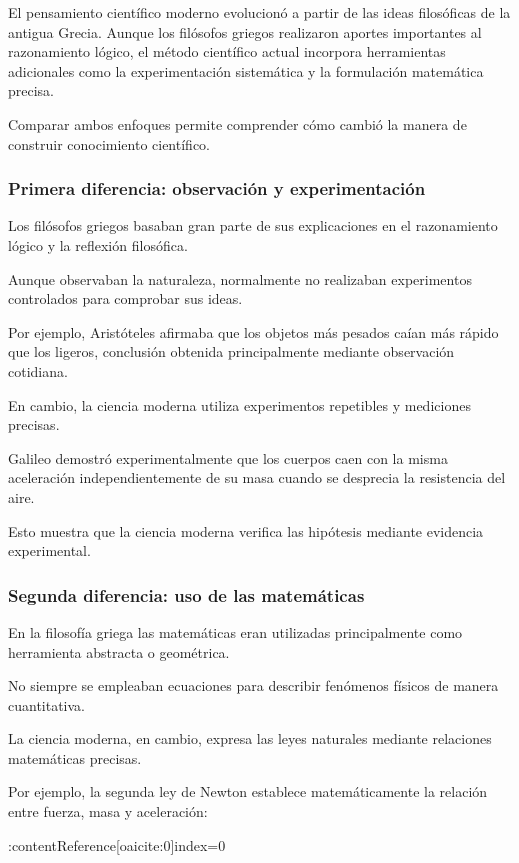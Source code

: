 \documentclass[12pt, a4paper]{article}
\begin{document}
El pensamiento científico moderno evolucionó a partir de las ideas filosóficas de la antigua Grecia. Aunque los filósofos griegos realizaron aportes importantes al razonamiento lógico, el método científico actual incorpora herramientas adicionales como la experimentación sistemática y la formulación matemática precisa.

Comparar ambos enfoques permite comprender cómo cambió la manera de construir conocimiento científico.

\subsubsection*{Primera diferencia: observación y experimentación}

Los filósofos griegos basaban gran parte de sus explicaciones en el razonamiento lógico y la reflexión filosófica.

Aunque observaban la naturaleza, normalmente no realizaban experimentos controlados para comprobar sus ideas.

Por ejemplo, Aristóteles afirmaba que los objetos más pesados caían más rápido que los ligeros, conclusión obtenida principalmente mediante observación cotidiana.

En cambio, la ciencia moderna utiliza experimentos repetibles y mediciones precisas.

Galileo demostró experimentalmente que los cuerpos caen con la misma aceleración independientemente de su masa cuando se desprecia la resistencia del aire.

Esto muestra que la ciencia moderna verifica las hipótesis mediante evidencia experimental.

\subsubsection*{Segunda diferencia: uso de las matemáticas}

En la filosofía griega las matemáticas eran utilizadas principalmente como herramienta abstracta o geométrica.

No siempre se empleaban ecuaciones para describir fenómenos físicos de manera cuantitativa.

La ciencia moderna, en cambio, expresa las leyes naturales mediante relaciones matemáticas precisas.

Por ejemplo, la segunda ley de Newton establece matemáticamente la relación entre fuerza, masa y aceleración:

:contentReference[oaicite:0]{index=0}
\end{document}
